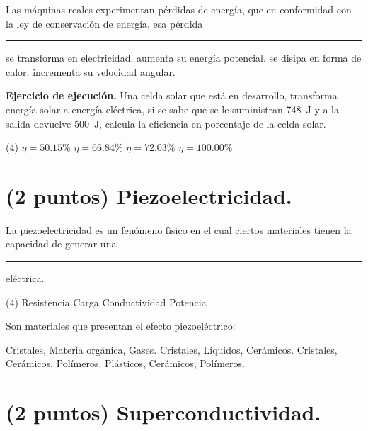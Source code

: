 \documentclass[12pt, letter]{exam}
\begin{document}
\begin{questions}
    \question Las máquinas reales experimentan pérdidas de energía, que en conformidad con la ley de conservación de energía, esa pérdida \rule{2cm}{0.1mm}
    \begin{multicols}{2}
    \begin{tasks}
        \task se transforma en electricidad.
        \task aumenta su energía potencial.
        \task se disipa en forma de calor.
        \task incrementa su velocidad angular.
    \end{tasks}
    \end{multicols}
    \question \label{Ejercicio_15} \textbf{Ejercicio de ejecución. } Una celda solar que está en desarrollo, transforma energía solar a energía eléctrica, si se sabe que se le suministran \SI{748}{\joule} y a la salida devuelve \SI{500}{\joule}, calcula la eficiencia en porcentaje de la celda solar.
    \begin{tasks}(4)
        \task $\eta = 50.15 \%$
        \task $\eta = 66.84 \%$
        \task $\eta = 72.03 \%$
        \task $\eta = 100.00 \%$
    \end{tasks}
    
    \section{(2 puntos) Piezoelectricidad.}

    \question La piezoelectricidad es un fenómeno físico en el cual ciertos materiales tienen la capacidad de generar una \rule{2cm}{0.1mm} eléctrica.
    \begin{tasks}(4)
        \task Resistencia
        \task Carga
        \task Conductividad
        \task Potencia
    \end{tasks}
    \question Son materiales que presentan el efecto piezoeléctrico:
    \begin{multicols}{2}
    \begin{tasks}
        \task Cristales, Materia orgánica, Gases.
        \task Cristales, Líquidos, Cerámicos.
        \task Cristales, Cerámicos, Polímeros.
        \task Plásticos, Cerámicos, Polímeros.
    \end{tasks}
    \end{multicols}

    \section{(2 puntos) Superconductividad.}


\end{questions}
\end{document}
